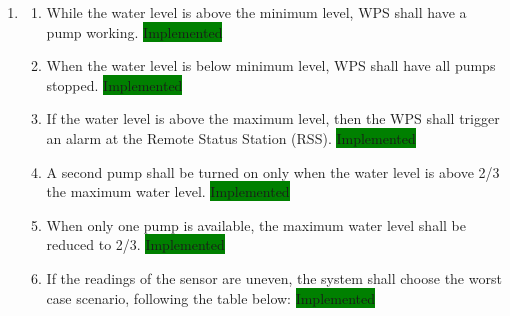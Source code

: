 \documentclass[11pt]{article}
\begin{document}
\begin{enumerate}[leftmargin=4em, font=\small, label=\textbf{SR-\arabic*}]
	\setlength\itemsep{.5em}
	\item 

		\begin{enumerate}[leftmargin=1.5em, font=\small, label=\textbf{.\arabic*:}]
		\setlength\itemsep{0em}
		\item While the water level is above the minimum level, WPS shall have a pump working. \colorbox{green}{Implemented}
		\item When the water level is below minimum level, WPS shall have all pumps stopped. \colorbox{green}{Implemented}
		\item If the water level is above the maximum level, then the WPS shall trigger an alarm at the Remote Status Station (RSS). \colorbox{green}{Implemented}
		\item A second pump shall be turned on only when the water level is above 2/3 the maximum water level. \colorbox{green}{Implemented}
		\item When only one pump is available, the maximum water level shall be reduced to 2/3. \colorbox{green}{Implemented}
		\item If the readings of the sensor are uneven, the system shall choose the worst case scenario, following the table below:  \colorbox{green}{Implemented}
		

\end{enumerate}
\end{enumerate}
\end{document}
